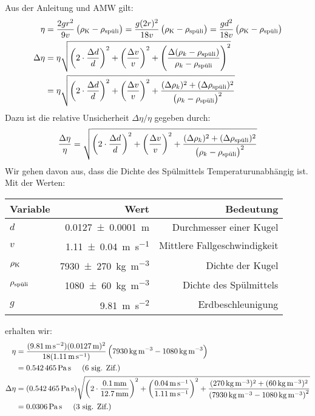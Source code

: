 		Aus der Anleitung und AMW gilt:
		\begin{align}
			\eta &= \frac{2gr^2}{9v}\left(\rhok - \rho_\spuli\right) 
			= \frac{g(2r)^2}{18v}\left(\rhok - \rho_\spuli\right) 
			= \frac{gd^2}{18v}\left(\rhok - \rho_\spuli\right) \\
			\Delta \eta &= \eta \sqrt{
				\left(2\cdot\frac{\Delta d}{d}\right)^2 +
				\left(\frac{\Delta v}{v}\right)^2 +
				\left(\frac{\Delta (\rho_k - \rho_\spuli)}{\rho_k - \rho_\spuli}\right)^2
			} \notag \\
			&= \eta \sqrt{
				\left(2\cdot\frac{\Delta d}{d}\right)^2 +
				\left(\frac{\Delta v}{v}\right)^2 +
				\frac{(\Delta \rho_k)^2 + (\Delta \rho_\spuli)^2}{\left(\rho_k - \rho_\spuli\right)^{2}}
			}
		\end{align}
		Dazu ist die relative Unsicherheit $\Delta \eta/\eta$ gegeben durch:
		\begin{align}
			\frac{\Delta \eta}{\eta} = \sqrt{
				\left(2\cdot\frac{\Delta d}{d}\right)^2 +
				\left(\frac{\Delta v}{v}\right)^2 +
				\frac{(\Delta \rho_k)^2 + (\Delta \rho_\spuli)^2}{\left(\rho_k - \rho_\spuli\right)^{2}}
			}
		\end{align}
		Wir gehen davon aus, dass die Dichte des Spülmittels Temperaturunabhängig ist.
		\newpage
		Mit der Werten:
		\begin{center}
			\begin{tabular}{lrr}
				\toprule
				Variable & Wert & Bedeutung \\
				\midrule
				$d$ & \SI{0.0127(1)}{\meter} & Durchmesser einer Kugel \\
				$v$ & \SI{1.11(4)}{\meter\per\second} & Mittlere Fallgeschwindigkeit  \\
				$\rhok$ & \SI{7930(270)}{\kilogram\per\meter\cubed} & Dichte der Kugel  \\
				$\rho_\spuli$ & \SI{1080(60)}{\kilo\gram\per\meter\cubed} & Dichte des Spülmittels  \\
				$g$ & \SI{9,81}{\meter\per\second\squared} & Erdbeschleunigung  \\
				\bottomrule
			\end{tabular}
		\end{center}
		erhalten wir:
		\begin{align}
			\eta &= \frac{(\SI{9,81}{\meter\per\second\squared}) (\SI{0.0127}{\meter})^2}{18(\SI{1.11}{\meter\per\second})}
			\left(\SI{7930}{\kilogram\per\meter\cubed}- \SI{1080}{\kilo\gram\per\meter\cubed}\right) \notag \\
			&= \SI{0.542465}{\pascal\second} \sigfig{6} \\
			\Delta\eta &= (\SI{0.542465}{\pascal\second}) \sqrt{
				\left(2\cdot\frac{\SI{0.1}{\milli\meter}}{\SI{12.7}{\milli\meter}}\right)^2 +
				\left(\frac{\SI{0.04}{\meter\per\second}}{\SI{1.11}{\meter\per\second}}\right)^2 +
				\frac{(\SI{270}{\kilogram\per\meter\cubed})^2 + (\SI{60}{\kilo\gram\per\meter\cubed})^2}{\left(\SI{7930}{\kilogram\per\meter\cubed} - \SI{1080}{\kilo\gram\per\meter\cubed}\right)^{2}}
			} \notag \\
			&= \SI{0.0306}{\pascal\second} \sigfig{3}
		\end{align}
